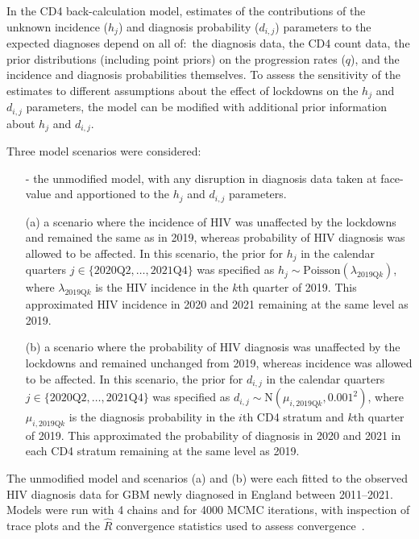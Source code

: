In the CD4 back-calculation model, estimates of the contributions of the unknown incidence ($h_j$) and diagnosis probability ($d_{i,j}$) parameters to the expected diagnoses depend on all of:\ the diagnosis data, the CD4 count data, the prior distributions (including point priors) on the progression rates ($q$), and the incidence and diagnosis probabilities themselves. To assess the sensitivity of the estimates to different assumptions about the effect of lockdowns on the $h_j$ and $d_{i,j}$ parameters, the model can be modified with additional prior information about $h_j$ and $d_{i,j}$.

Three model scenarios were considered:
%
\begin{enumerate}
  \item[-] the unmodified model, with any disruption in diagnosis data taken at face-value and apportioned to the $h_j$ and $d_{i,j}$ parameters.

  \item[(a)] a scenario where the incidence of HIV was unaffected by the lockdowns and remained the same as in 2019, whereas probability of HIV diagnosis was allowed to be affected. In this scenario, the prior for $h_j$ in the calendar quarters $j \in \{2020\text{Q}2,\dots, 2021\text{Q}4\}$ was specified as $h_j \sim \text{Poisson}(\lambda_{2019\text{Q}k})$, where $\lambda_{2019\text{Q}k}$ is the HIV incidence in the $k$th quarter of 2019. This approximated HIV incidence in 2020 and 2021 remaining at the same level as 2019.

  \item[(b)] a scenario where the probability of HIV diagnosis was unaffected by the lockdowns and remained unchanged from 2019, whereas incidence was allowed to be affected. In this scenario, the prior for $d_{i,j}$ in the calendar quarters $j \in \{2020\text{Q}2,\dots, 2021\text{Q}4\}$ was specified as $d_{i,j} \sim \text{N}(\mu_{i,2019\text{Q}k}, 0.001^2)$, where $\mu_{i,2019\text{Q}k}$ is the diagnosis probability in the $i$th CD4 stratum and $k$th quarter of 2019. This approximated the probability of diagnosis in 2020 and 2021 in each CD4 stratum remaining at the same level as 2019.
\end{enumerate}

The unmodified model and scenarios (a) and (b) were each fitted to the observed HIV diagnosis data for GBM newly diagnosed in England between 2011--2021. Models were run with 4 chains and for 4000 MCMC iterations, with inspection of trace plots and the $\hat{R}$ convergence statistics used to assess convergence~\parencite{Gelman1992-md}.

